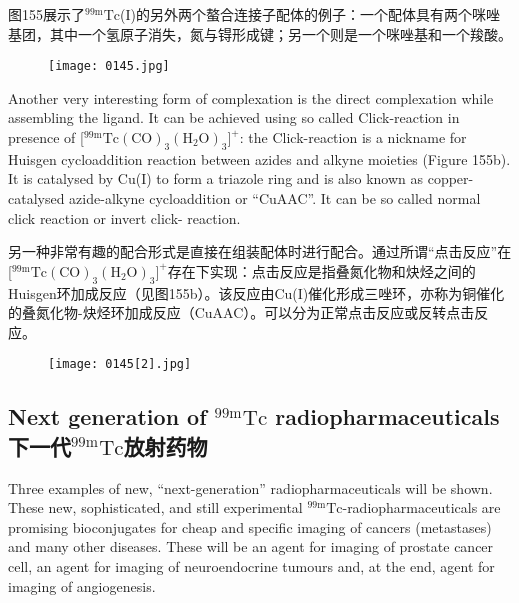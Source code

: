 \documentclass[dvipsnames, svgnames,a4paper,11pt]{article}
\begin{document}
图155展示了${}^\mathrm{99m}\mathrm{Tc}$(I)的另外两个螯合连接子配体的例子：一个配体具有两个咪唑基团，其中一个氢原子消失，氮与锝形成键；另一个则是一个咪唑基和一个羧酸。

\begin{figure}[h]
	\centering
    \texttt{[image: 0145.jpg]}    
     \label{fig155}
\end{figure}

Another very interesting form of complexation is the direct complexation while
assembling the ligand. It can be achieved using so called Click-reaction in presence
of [${}^\mathrm{99m}\mathrm{Tc(CO)_3(H_2O)_3]^+}$: the Click-reaction is a nickname for Huisgen cycloaddition
reaction between azides and alkyne moieties (Figure 155b). It is catalysed by Cu(I)
to form a triazole ring and is also known as copper-catalysed azide-alkyne
cycloaddition or “CuAAC”. It can be so called normal click reaction or invert click-
reaction.

另一种非常有趣的配合形式是直接在组装配体时进行配合。通过所谓“点击反应”在[${}^\mathrm{99m}\mathrm{Tc(CO)_3(H_2O)_3]^+}$存在下实现：点击反应是指叠氮化物和炔烃之间的Huisgen环加成反应（见图155b）。该反应由Cu(I)催化形成三唑环，亦称为铜催化的叠氮化物-炔烃环加成反应（CuAAC）。可以分为正常点击反应或反转点击反应。

\begin{figure}[h]
	\centering
    \texttt{[image: 0145[2].jpg]}    
     \label{fig155b}
\end{figure}

\subsection{Next generation of ${}^\mathrm{99m}\mathrm{Tc}$ radiopharmaceuticals \\下一代${}^\mathrm{99m}\mathrm{Tc}$放射药物}
Three examples of new, “next-generation” radiopharmaceuticals will be shown.
These new, sophisticated, and still experimental ${}^\mathrm{99m}\mathrm{Tc}$-radiopharmaceuticals are
promising bioconjugates for cheap and specific imaging of cancers (metastases) and
many other diseases. These will be an agent for imaging of prostate cancer cell, an
agent for imaging of neuroendocrine tumours and, at the end, agent for imaging of
angiogenesis.
\end{document}
